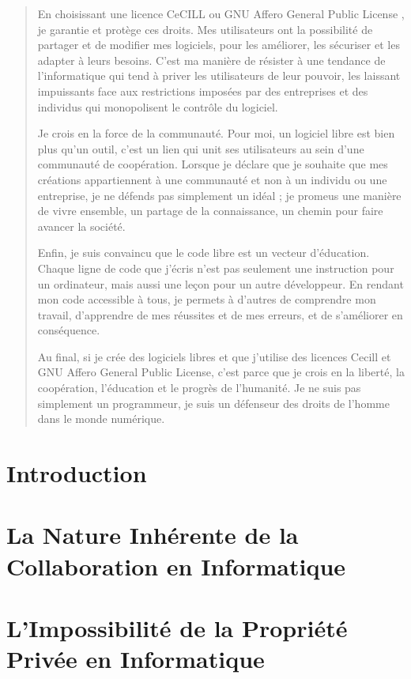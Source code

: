 \documentclass[10pt]{book}
\begin{document}
\begin{quotation}
	En choisissant une licence CeCILL \cite{cecill} ou GNU Affero General Public License \cite{agpl}, je garantie et protège ces droits. Mes utilisateurs ont la possibilité de partager et de modifier mes logiciels, pour les améliorer, les sécuriser et les adapter à leurs besoins. C'est ma manière de résister à une tendance de l'informatique qui tend à priver les utilisateurs de leur pouvoir, les laissant impuissants face aux restrictions imposées par des entreprises et des individus qui monopolisent le contrôle du logiciel.

Je crois en la force de la communauté. Pour moi, un logiciel libre est bien plus qu'un outil, c'est un lien qui unit ses utilisateurs au sein d'une communauté de coopération. Lorsque je déclare que je souhaite que mes créations appartiennent à une communauté et non à un individu ou une entreprise, je ne défends pas simplement un idéal ; je promeus une manière de vivre ensemble, un partage de la connaissance, un chemin pour faire avancer la société.

Enfin, je suis convaincu que le code libre est un vecteur d'éducation. Chaque ligne de code que j'écris n'est pas seulement une instruction pour un ordinateur, mais aussi une leçon pour un autre développeur. En rendant mon code accessible à tous, je permets à d'autres de comprendre mon travail, d'apprendre de mes réussites et de mes erreurs, et de s'améliorer en conséquence.

Au final, si je crée des logiciels libres et que j'utilise des licences Cecill et GNU Affero General Public License, c'est parce que je crois en la liberté, la coopération, l'éducation et le progrès de l'humanité. Je ne suis pas simplement un programmeur, je suis un défenseur des droits de l'homme dans le monde numérique.
\end{quotation}

\newpage
\chapter*{Introduction}

\chapter{La Nature Inhérente de la Collaboration en Informatique}

\chapter{L'Impossibilité de la Propriété Privée en Informatique}

\end{document}
